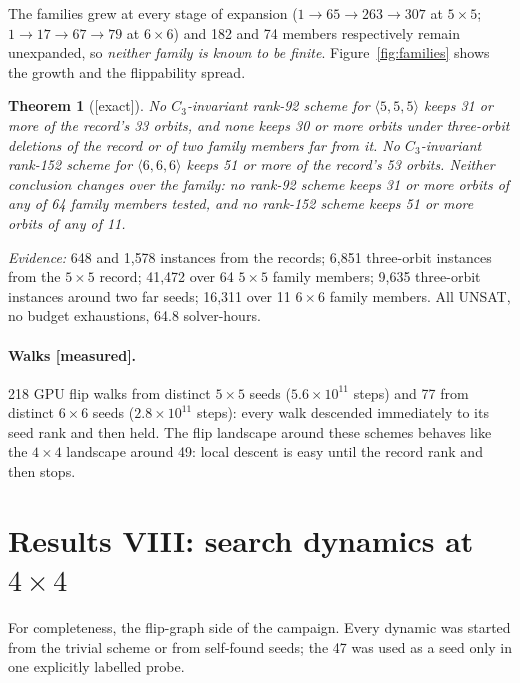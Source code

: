 \documentclass[11pt]{article}
\newtheorem{theorem}{Theorem}
\newcommand{\tw}[3]{\langle #1,#2,#3\rangle}
\begin{document}
The families grew at every stage of expansion ($1 \to 65 \to 263 \to 307$ at $5\times5$;
$1\to17\to67\to79$ at $6\times6$) and 182 and 74 members respectively remain unexpanded, so
\emph{neither family is known to be finite}. Figure~\ref{fig:families} shows the growth and the
flippability spread.

\begin{theorem}[{[exact]}]
\label{thm:t4t5}
No $C_3$-invariant rank-92 scheme for $\tw555$ keeps 31 or more of the record's 33 orbits, and none keeps
30 or more orbits under three-orbit deletions of the record or of two family members far from it. No
$C_3$-invariant rank-152 scheme for $\tw666$ keeps 51 or more of the record's 53 orbits. Neither
conclusion changes over the family: no rank-92 scheme keeps 31 or more orbits of any of 64 family members
tested, and no rank-152 scheme keeps 51 or more orbits of any of 11.
\end{theorem}
\noindent\emph{Evidence:} 648 and 1{,}578 instances from the records; 6{,}851 three-orbit instances from
the $5\times5$ record; 41{,}472 over 64 $5\times5$ family members; 9{,}635 three-orbit instances around
two far seeds; 16{,}311 over 11 $6\times6$ family members. All UNSAT, no budget exhaustions, 64.8
solver-hours.

\paragraph{Walks [measured].} 218 GPU flip walks from distinct $5\times5$ seeds
($5.6\times10^{11}$ steps) and 77 from distinct $6\times6$ seeds ($2.8\times10^{11}$ steps): every walk
descended immediately to its seed rank and then held. The flip landscape around these schemes behaves
like the $4\times4$ landscape around 49: local descent is easy until the record rank and then stops.

\section{Results VIII: search dynamics at $4\times4$}

For completeness, the flip-graph side of the campaign. Every dynamic was started from the trivial scheme
or from self-found seeds; the 47 was used as a seed only in one explicitly labelled probe.
\end{document}
